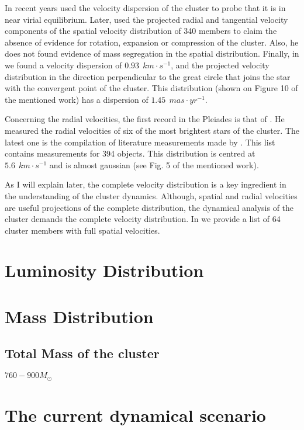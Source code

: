 In recent years \citet{Pinfield1998} used the velocity dispersion of the cluster to probe that it is in near virial equilibrium. Later, \citet{2006ARep...50..714L} used the projected radial and tangential velocity components of the spatial velocity distribution of 340 members to claim the absence of evidence for rotation, expansion or compression of the cluster. Also, he does not found evidence of mass segregation in the spatial distribution. Finally, in \citet{Galli2017} we found a velocity dispersion of $0.93 \ \ km\cdot s^{-1}$, and the projected velocity distribution in the direction perpendicular to the great circle that joins the star with the convergent point of the cluster. This distribution (shown on Figure 10 of the mentioned work) has a dispersion of $1.45 \ \ mas\cdot yr^{-1}$. 

Concerning the radial velocities, the first record in the Pleiades is that of \citet{1904ApJ....19..338A}. He measured the radial velocities of six of the most brightest stars of the cluster. The latest one is the compilation of literature measurements made by \citet{Galli2017}. This list contains measurements for 394 objects. This distribution is centred at $5.6\ \ km \cdot s^{-1}$ and is almost gaussian (see Fig. 5 of the mentioned work). 

As I will explain later, the complete velocity distribution is a key ingredient in the understanding of the cluster dynamics. Although, spatial and radial velocities are useful projections of the complete distribution, the dynamical analysis of the cluster demands the complete velocity distribution. In \citet{Galli2017} we provide a list of 64 cluster members with full spatial velocities. 
\section{Luminosity Distribution}

\section{Mass Distribution}


\subsection{Total Mass of the cluster}
\citet{Limber1961} $760-900 M_{\odot}$
\citet{Pinfield1998}
\section{The current dynamical scenario}
